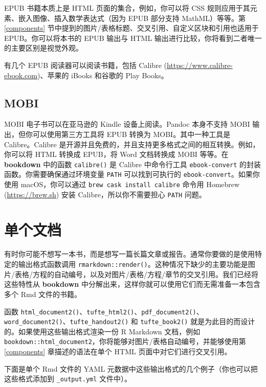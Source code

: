 \documentclass[
  12pt,
]{krantz}
\theoremstyle{definition}
\theoremstyle{definition}
\theoremstyle{definition}
\theoremstyle{definition}
\theoremstyle{remark}
\begin{document}
EPUB 书籍本质上是 HTML 页面的集合，例如，你可以将 CSS 规则应用于其元素、嵌入图像、插入数学表达式（因为 EPUB 部分支持 MathML）等等。第 \ref{components} 节中提到的图片/表格标题、交叉引用、自定义区块和引用也适用于 EPUB。你可以将本书的 EPUB 输出与 HTML 输出进行比较，你将看到二者唯一的主要区别是视觉外观。

有几个 EPUB 阅读器可以阅读书籍，包括 Calibre (\url{https://www.calibre-ebook.com})、苹果的 iBooks 和谷歌的 Play Books。

\subsection{MOBI}\label{mobi}

MOBI 电子书可以在亚马逊的 Kindle 设备上阅读。Pandoc 本身不支持 MOBI 输出，但你可以使用第三方工具将 EPUB 转换为 MOBI。其中一种工具是 Calibre。Calibre 是开源并且免费的，并且支持更多格式之间的相互转换。例如，你可以将 HTML 转换成 EPUB，将 Word 文档转换成 MOBI 等等。在 \textbf{bookdown} 中的函数 \texttt{calibre()} 是 Calibre 中命令行工具 \texttt{ebook-convert} 的封装函数。你需要确保通过环境变量 \texttt{PATH} 可以找到可执行的 \texttt{ebook-convert}。如果你使用 macOS，你可以通过 \texttt{brew\ cask\ install\ calibre} 命令用 Homebrew (\url{https://brew.sh}) 安装 Calibre，所以你不需要担心 \texttt{PATH} 问题。

\section{单个文档}\label{a-single-document}

有时你可能不想写一本书，而是想写一篇长篇文章或报告。通常你要做的是使用特定的输出格式函数调用 \texttt{rmarkdown::render()}。这种情况下缺少的主要功能是图片/表格/方程的自动编号，以及对图片/表格/方程/章节的交叉引用。我们已经将这些特性从 \textbf{bookdown} 中分解出来，这样你就可以使用它们而无需准备一本包含多个 Rmd 文件的书籍。

函数 \texttt{html\_document2()}、\texttt{tufte\_html2()}、\texttt{pdf\_document2()}、\texttt{word\_document2()}、\texttt{tufte\_handout2()} 和 \texttt{tufte\_book2()} 就是为此目的而设计的。如果使用这些输出格式渲染一份 R Markdown 文档，例如 \texttt{bookdown::html\_document2}，你将能够对图片/表格自动编号，并能够使用第 \ref{components} 章描述的语法在单个 HTML 页面中对它们进行交叉引用。

下面是单个 Rmd 文件的 YAML 元数据中这些输出格式的几个例子（你也可以把这些格式添加到 \texttt{\_output.yml} 文件中）。
\end{document}
